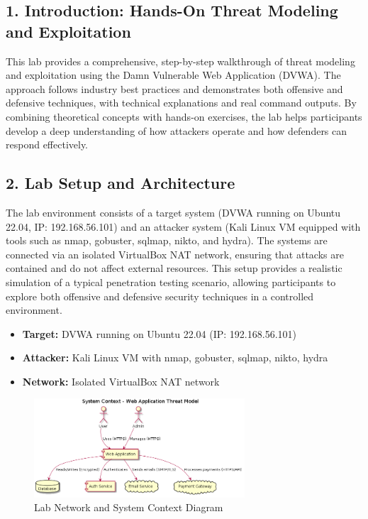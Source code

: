 
\subsection*{1. Introduction: Hands-On Threat Modeling and Exploitation}
This lab provides a comprehensive, step-by-step walkthrough of threat modeling and exploitation using the Damn Vulnerable Web Application (DVWA)\cite{owasp}. The approach follows industry best practices\cite{shostack2014,uceda2015} and demonstrates both offensive and defensive techniques, with technical explanations and real command outputs. By combining theoretical concepts with hands-on exercises, the lab helps participants develop a deep understanding of how attackers operate and how defenders can respond effectively.

\subsection*{2. Lab Setup and Architecture}
The lab environment consists of a target system (DVWA running on Ubuntu 22.04, IP: 192.168.56.101) and an attacker system (Kali Linux VM equipped with tools such as nmap, gobuster, sqlmap, nikto, and hydra). The systems are connected via an isolated VirtualBox NAT network, ensuring that attacks are contained and do not affect external resources. This setup provides a realistic simulation of a typical penetration testing scenario, allowing participants to explore both offensive and defensive security techniques in a controlled environment.
\begin{itemize}
    \item \textbf{Target:} DVWA running on Ubuntu 22.04 (IP: 192.168.56.101)
    \item \textbf{Attacker:} Kali Linux VM with nmap, gobuster, sqlmap, nikto, hydra
    \item \textbf{Network:} Isolated VirtualBox NAT network
\end{itemize}

\begin{figure}[H]
    \centering
    \includegraphics[width=0.7\textwidth]{images/system-context}
    \caption{Lab Network and System Context Diagram}
\end{figure}


